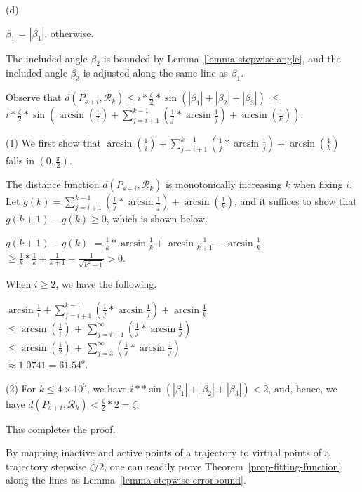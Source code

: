 (d) {$\beta_1$ = $|\beta_1|$, otherwise.

The included angle $\beta_2$ is bounded by Lemma~\ref{lemma-stepwise-angle}, and  the included angle $\beta_3$ is adjusted along the same line as $\beta_1$.

Observe that $d(P_{s+i}, \mathcal{R}_{k})\le i*\frac{\zeta}{2}*\sin(|\beta_1| + |\beta_2| + |\beta_3|)$
%
$\le$ $i*\frac{\zeta}{2}*\sin(\arcsin(\frac{1}{i})+\sum_{j=i+1}^{k-1}{(\frac{1}{j}*\arcsin\frac{1}{j})}+\arcsin(\frac{1}{k}))$.


(1) We first show that $\arcsin(\frac{1}{i})+\sum_{j=i+1}^{k-1}{(\frac{1}{j}*\arcsin\frac{1}{j})}+\arcsin(\frac{1}{k})$ falls in $(0, \frac{\pi}{2})$.


The distance function $d(P_{s+i}, \mathcal{R}_{k})$ is monotonically increasing \wrt $k$ when fixing $i$. %
Let $g(k) = \sum_{j=i+1}^{k-1}{(\frac{1}{j}*\arcsin\frac{1}{j})}+\arcsin(\frac{1}{k})$, and it suffices to show that $g(k+1) - g(k)\ge 0$, which is shown below.

$g(k+1) - g(k)$ $= \frac{1}{k}*\arcsin\frac{1}{k} + \arcsin\frac{1}{k+1} - \arcsin\frac{1}{k}$\\
$\ge \frac{1}{k}*\frac{1}{k} + \frac{1}{k+1} - \frac{1}{\sqrt{k^2-1}} > 0$.


When $i\ge 2$, we have the following.

 $\arcsin\frac{1}{i}+\sum_{j=i+1}^{k-1}{(\frac{1}{j}*\arcsin\frac{1}{j})} + \arcsin\frac{1}{k}$\\
 $\le\arcsin(\frac{1}{i})$ + $\sum_{j=i+1}^{\infty}{(\frac{1}{j}*\arcsin\frac{1}{j})}$\\
 $\le\arcsin(\frac{1}{2})$ + $\sum_{j=3}^{\infty}{(\frac{1}{j}*\arcsin\frac{1}{j})}$\\
 $\approx 1.0741 = 61.54^o$.


(2) For $k\le 4\times 10^5$, we have $i**\sin(|\beta_1| + |\beta_2| + |\beta_3|)<2$, and, hence,
we have $d(P_{s+i}, \mathcal{R}_{k})< \frac{\zeta}{2}*2 = \zeta$.


This completes the proof.
\eop
\vspace{1ex}


By mapping inactive and active points of a trajectory to virtual points of a trajectory stepwise \wrt ${\zeta}/2$, one can readily prove Theorem~\ref{prop-fitting-function} along the lines as Lemma~\ref{lemma-stepwise-errorbound}.


}
